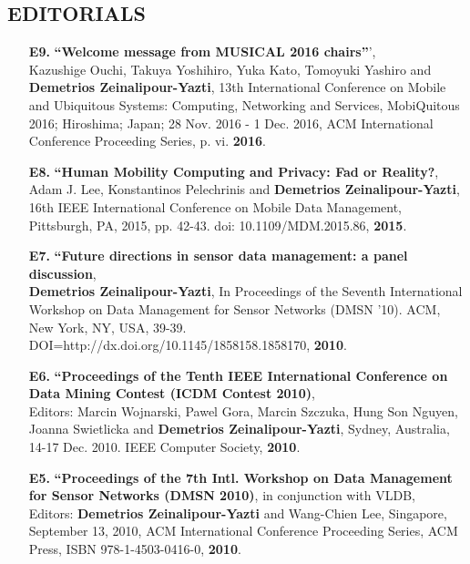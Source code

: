 \documentclass[10pt]{article}
\begin{document}
\subsection*{EDITORIALS}
\begin{enumerate}

\item[{\bf E9.}]
\label{E9}
{\bf ``Welcome message from MUSICAL 2016 chairs''}',  \\
Kazushige Ouchi, Takuya Yoshihiro, Yuka Kato, Tomoyuki Yashiro and {\bf Demetrios Zeinalipour-Yazti},
13th International Conference on Mobile and Ubiquitous Systems: Computing, Networking and Services, MobiQuitous 2016; Hiroshima; Japan; 28 Nov. 2016 - 1 Dec. 2016, ACM International Conference Proceeding Series, p. vi. {\bf 2016}.

\item[{\bf E8.}]
\label{E8}
{\bf ``Human Mobility Computing and Privacy: Fad or Reality?},  \\
Adam J. Lee, Konstantinos Pelechrinis and {\bf Demetrios Zeinalipour-Yazti},
16th IEEE International Conference on Mobile Data Management, Pittsburgh, PA, 2015, pp. 42-43.
doi: 10.1109/MDM.2015.86, {\bf 2015}.


\item[{\bf E7.}]
\label{E7}
{\bf ``Future directions in sensor data management: a panel discussion},  \\
{\bf Demetrios Zeinalipour-Yazti},
In Proceedings of the Seventh International Workshop on Data Management for Sensor Networks (DMSN '10). ACM, New York, NY, USA, 39-39. DOI=http://dx.doi.org/10.1145/1858158.1858170, {\bf 2010}.

\item[{\bf E6.}]
\label{E6}
{\bf ``Proceedings of the Tenth IEEE International Conference on Data Mining Contest (ICDM Contest 2010)},  \\
Editors: Marcin Wojnarski, Pawel Gora, Marcin Szczuka, Hung Son Nguyen, Joanna Swietlicka and {\bf Demetrios Zeinalipour-Yazti}, Sydney, Australia, 14-17 Dec. 2010. IEEE Computer Society, {\bf 2010}.

\item[{\bf E5.}]
\label{E5}
{\bf ``Proceedings of the 7th Intl. Workshop on Data Management for Sensor Networks (DMSN 2010)},
in conjunction with VLDB, \\
Editors: {\bf Demetrios Zeinalipour-Yazti} and Wang-Chien Lee, Singapore, September 13, 2010, ACM International Conference Proceeding Series, ACM Press, ISBN 978-1-4503-0416-0, {\bf 2010}.


\end{enumerate}
\end{document}

